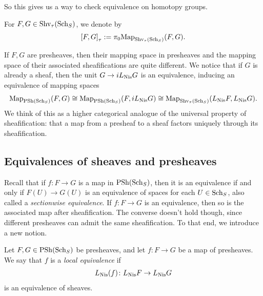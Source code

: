 \documentclass[11pt,openany]{book}
\renewcommand{\Pre}{\mathrm{PSh}}
\begin{document}
So this gives us a way to check equivalence on homotopy groups.

\begin{notation} For $F,G \in \mathrm{Shv}_\tau(\mathrm{Sch}_S)$, we denote by 
\begin{align*}
    \left[ F,G \right]_\tau := \pi_0 \mathrm{Map}_{\mathrm{Shv}_\tau(\mathrm{Sch}_S)}(F,G).
\end{align*}
\end{notation}

\begin{remark} If $F,G$ are presheaves, then their mapping space in presheaves and the mapping space of their associated sheafifications are quite different. We notice that if $G$ is already a sheaf, then the unit $G \to i L_{\mathrm{Nis}} G$ is an equivalence, inducing an equivalence of mapping spaces
\begin{align*}
    \Map_{\Pre(\Sch_S)}(F,G) \cong \Map_{\Pre(\Sch_S)}(F, i L_\Nis G) \cong \Map_{\Shv_\tau(\Sch_S)}(L_\Nis F, L_\Nis G).
\end{align*}
We think of this as a higher categorical analogue of the universal property of sheafification: that a map from a presheaf to a sheaf factors uniquely through its sheafification.
\end{remark}



\subsection{Equivalences of sheaves and presheaves}

Recall that if $f\colon F \to G$ is a map in $\Pre(\Sch_S)$, then it is an equivalence if and only if $F(U) \to G(U)$ is an equivalence of spaces for each $U \in \mathrm{Sch}_S$, also called a \textit{sectionwise equivalence}. If $f\colon F \to G$ is an equivalence, then so is the associated map after sheafification. The converse doesn't hold though, since different presheaves can admit the same sheafification. To that end, we introduce a new notion.

\begin{definition} Let $F,G\in \Pre(\Sch_S)$ be presheaves, and let $f \colon F \to G$ be a map of presheaves. We say that $f$ is a \textit{local equivalence} if
\begin{align*}
    L_{\mathrm{Nis}} (f) \colon L_{\mathrm{Nis}} F \to L_{\mathrm{Nis}} G
\end{align*}
is an equivalence of sheaves.
\end{definition}
\end{document}

